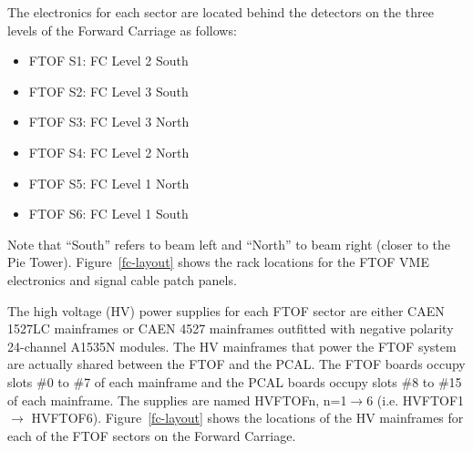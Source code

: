 \documentclass[12pt]{article}
\begin{document}
The electronics for each sector are located behind the detectors on the three levels of the
Forward Carriage as follows:

\vskip 0.5cm

\begin{minipage}{0.5\textwidth}
\begin{itemize}
\item FTOF S1: FC Level 2 South
\item FTOF S2: FC Level 3 South
\item FTOF S3: FC Level 3 North
\end{itemize}
\end{minipage}
\begin{minipage}{0.5\textwidth}
\begin{itemize}
\item FTOF S4: FC Level 2 North
\item FTOF S5: FC Level 1 North
\item FTOF S6: FC Level 1 South
\end{itemize}
\end{minipage}

\vskip 0.5cm

Note that ``South'' refers to beam left and ``North'' to beam right (closer to the Pie 
Tower). Figure~\ref{fc-layout} shows the rack locations for the FTOF VME electronics and 
signal cable patch panels. 

The high voltage (HV) power supplies for each FTOF sector are either CAEN 1527LC 
mainframes or CAEN 4527 mainframes outfitted with negative polarity 24-channel A1535N 
modules. The HV mainframes that power the FTOF system are actually shared between the 
FTOF and the PCAL. The FTOF boards occupy slots \#0 to \#7 of each mainframe and the 
PCAL boards occupy slots \#8 to \#15 of each mainframe. The supplies are named HVFTOFn, 
n=1$\to$6 (i.e. HVFTOF1 $\to$ HVFTOF6). Figure~\ref{fc-layout} shows the locations of the 
HV mainframes for each of the FTOF sectors on the Forward Carriage.
\end{document}
